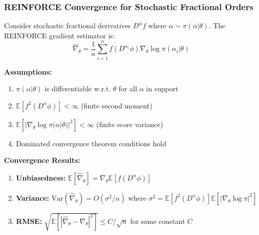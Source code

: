\subsubsection{REINFORCE Convergence for Stochastic Fractional Orders}

\begin{theorem}
Consider stochastic fractional derivatives $D^{\alpha} f$ where $\alpha \sim \pi(\alpha|\theta)$. The REINFORCE gradient estimator is:
\begin{equation}
\hat{\nabla}_\theta = \frac{1}{n} \sum_{i=1}^n f(D^{\alpha_i} \phi) \nabla_\theta \log \pi(\alpha_i|\theta)
\end{equation}

\textbf{Assumptions:}
\begin{enumerate}
\item $\pi(\alpha|\theta)$ is differentiable w.r.t. $\theta$ for all $\alpha$ in support
\item $\mathbb{E}[f^2(D^{\alpha} \phi)] < \infty$ (finite second moment)
\item $\mathbb{E}[|\nabla_\theta \log \pi(\alpha|\theta)|^2] < \infty$ (finite score variance)
\item Dominated convergence theorem conditions hold
\end{enumerate}

\textbf{Convergence Results:}
\begin{enumerate}
\item \textbf{Unbiasedness:} $\mathbb{E}[\hat{\nabla}_\theta] = \nabla_\theta \mathbb{E}[f(D^{\alpha} \phi)]$
\item \textbf{Variance:} $\text{Var}(\hat{\nabla}_\theta) = O(\sigma^2/n)$ where $\sigma^2 = \mathbb{E}[f^2(D^{\alpha} \phi)] \mathbb{E}[|\nabla_\theta \log \pi|^2]$
\item \textbf{RMSE:} $\sqrt{\mathbb{E}[|\hat{\nabla}_\theta - \nabla_\theta|^2]} \leq C/\sqrt{n}$ for some constant $C$
\end{enumerate}
\end{theorem}

